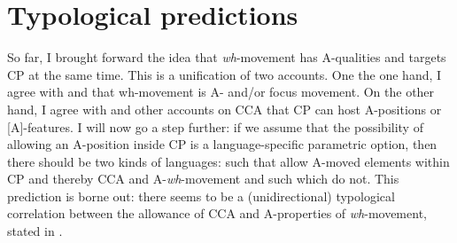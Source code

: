 \documentclass[output=paper,colorlinks,citecolor=brown]{langscibook}
\begin{document}
\section{Typological predictions}\label{sec:lohninger:4}
So far, I brought forward the idea that \textit{wh}-movement has A-qualities and targets CP at the same time. This is a unification of two accounts. One the one hand, I agree with \citet{richards1997} and \citet{bovskovic2002multiple} that wh-movement is A- and/or focus movement. On the other hand, I agree with \citet{wurmbrand2018cross} and other accounts on CCA that CP can host A-positions or [A]-features. I will now go a step further: if we assume that the possibility of allowing an A-position inside CP is a language-specific parametric option, then there should be two kinds of languages: such that allow A-moved elements within CP and thereby CCA and A-\textit{wh}-movement and such which do not. This prediction is borne out: there seems to be a (unidirectional) typological correlation between the allowance of CCA and A-properties of \textit{wh}-movement, stated in .
\end{document}

